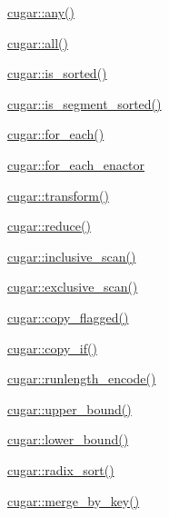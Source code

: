 \begin{DoxyItemize}
\item \hyperlink{group___primitives_ga71416af3e5407b31c78a10026520dbed}{cugar\+::any()}
\item \hyperlink{group___primitives_gaa98aa06ec6a5f38dda15d74ce0c47d57}{cugar\+::all()}
\item \hyperlink{group___primitives_gaec6f4aab196d418865686901c11a093c}{cugar\+::is\+\_\+sorted()}
\item \hyperlink{group___primitives_ga5e6eb75d00ed617295bcee0b1db0ee3e}{cugar\+::is\+\_\+segment\+\_\+sorted()}
\item \hyperlink{group___primitives_ga1e40de6d157d7b833f31f13a26a3bd04}{cugar\+::for\+\_\+each()}
\item \hyperlink{structcugar_1_1for__each__enactor}{cugar\+::for\+\_\+each\+\_\+enactor}
\item \hyperlink{group___primitives_gab584ee91ed39f9b1fec5aa0e7a0284a4}{cugar\+::transform()}
\item \hyperlink{group___primitives_gab8f49b135164aaef1fb6b51b90874915}{cugar\+::reduce()}
\item \hyperlink{group___primitives_ga6c5ea5be5565ce7aa2c99b3e602a7cb7}{cugar\+::inclusive\+\_\+scan()}
\item \hyperlink{group___primitives_ga1394066fd7b6215bcae781ca56cae872}{cugar\+::exclusive\+\_\+scan()}
\item \hyperlink{group___primitives_gaafc4aac8b44cf750c98a3a97fe72e5c6}{cugar\+::copy\+\_\+flagged()}
\item \hyperlink{group___primitives_ga536856eaa09125bec01892d565a49f8e}{cugar\+::copy\+\_\+if()}
\item \hyperlink{group___primitives_gae48c0c95572ea1dd13ec562eed6e2755}{cugar\+::runlength\+\_\+encode()}
\item \hyperlink{group___algorithms_module_gafe7ee3a93350b3d2f7f7bb6266ee0425}{cugar\+::upper\+\_\+bound()}
\item \hyperlink{group___algorithms_module_gab5ce2c7f834a31bc40d9101865dec5d1}{cugar\+::lower\+\_\+bound()}
\item \hyperlink{group___primitives_gac4584fb9407d3d12ff3a4a1890e9b903}{cugar\+::radix\+\_\+sort()}
\item \hyperlink{group___algorithms_module_ga267a2752f3e81f521e759ec274b80561}{cugar\+::merge\+\_\+by\+\_\+key()}
\end{DoxyItemize}

